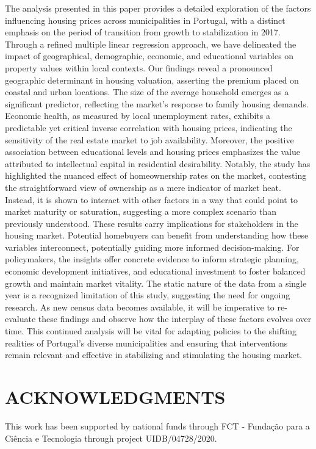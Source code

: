 \documentclass{aip-cp}
\begin{document}
The analysis presented in this paper provides a detailed exploration of the factors influencing housing prices across municipalities in Portugal, with a distinct emphasis on the period of transition from growth to stabilization in 2017. Through a refined multiple linear regression approach, we have delineated the impact of geographical, demographic, economic, and educational variables on property values within local contexts.
Our findings reveal a pronounced geographic determinant in housing valuation, asserting the premium placed on coastal and urban locations. The size of the average household emerges as a significant predictor, reflecting the market's response to family housing demands. Economic health, as measured by local unemployment rates, exhibits a predictable yet critical inverse correlation with housing prices, indicating the sensitivity of the real estate market to job availability. Moreover, the positive association between educational levels and housing prices emphasizes the value attributed to intellectual capital in residential desirability.
Notably, the study has highlighted the nuanced effect of homeownership rates on the market, contesting the straightforward view of ownership as a mere indicator of market heat. Instead, it is shown to interact with other factors in a way that could point to market maturity or saturation, suggesting a more complex scenario than previously understood.
These results carry implications for stakeholders in the housing market. Potential homebuyers can benefit from understanding how these variables interconnect, potentially guiding more informed decision-making. For policymakers, the insights offer concrete evidence to inform strategic planning, economic development initiatives, and educational investment to foster balanced growth and maintain market vitality.
The static nature of the data from a single year is a recognized limitation of this study, suggesting the need for ongoing research. As new census data becomes available, it will be imperative to re-evaluate these findings and observe how the interplay of these factors evolves over time. This continued analysis will be vital for adapting policies to the shifting realities of Portugal's diverse municipalities and ensuring that interventions remain relevant and effective in stabilizing and stimulating the housing market.


\section{ACKNOWLEDGMENTS}
This work has been supported by national funds through FCT - Fundação para a Ciência e Tecnologia through project UIDB/04728/2020.


\nocite{*}
%
%
\end{document}
